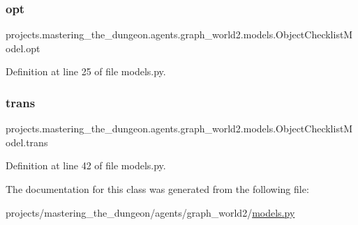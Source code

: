 \subsubsection{\texorpdfstring{opt}{opt}}
{\footnotesize\ttfamily projects.\+mastering\+\_\+the\+\_\+dungeon.\+agents.\+graph\+\_\+world2.\+models.\+Object\+Checklist\+Model.\+opt}



Definition at line 25 of file models.\+py.

\mbox{\label{classprojects_1_1mastering__the__dungeon_1_1agents_1_1graph__world2_1_1models_1_1ObjectChecklistModel_a94e7da3c37ddc0135e49dc1d823cab46}} 
\subsubsection{\texorpdfstring{trans}{trans}}
{\footnotesize\ttfamily projects.\+mastering\+\_\+the\+\_\+dungeon.\+agents.\+graph\+\_\+world2.\+models.\+Object\+Checklist\+Model.\+trans}



Definition at line 42 of file models.\+py.



The documentation for this class was generated from the following file\+:\begin{DoxyCompactItemize}
\item 
projects/mastering\+\_\+the\+\_\+dungeon/agents/graph\+\_\+world2/\hyperlink{models_8py}{models.\+py}\end{DoxyCompactItemize}
